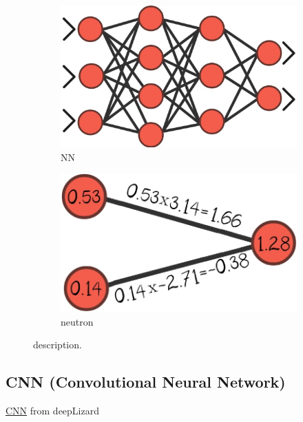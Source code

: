 \begin{figure}[!h]
	\centering
	\begin{subfigure}{0.49\textwidth}
		\includegraphics[width=\linewidth]{images/howItWorks_NNlayers}
		\caption{NN}
		\label{fig:howItWorks_NNlayers}
	\end{subfigure}
	\begin{subfigure}{0.49\textwidth}
		\includegraphics[width=\linewidth]{images/howItWorks_neutron}
		\captionsetup{margin=0.5cm}
		\caption{neutron}
		\label{fig:howItWorks_neutron}
	\end{subfigure}
	\captionsetup{margin=0.5cm}
	\caption{description.}
	\label{fig:howItWorks_NN}
\end{figure}

\subsection{CNN (Convolutional Neural Network)} \label{sec:cnn}
\href{https://www.youtube.com/watch?v=YRhxdVk_sIs}{CNN} from deepLizard

